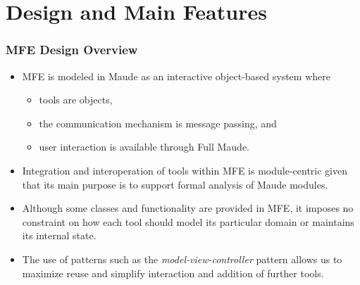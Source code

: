 \documentclass[xcolor=dvipsnames,10pt]{beamer}
\newcommand{\enfa}[1]{{\color{Red}#1}}
\begin{document}
\section{Design and Main Features}


\begin{frame}
  \frametitle{MFE Design Overview}

  \begin{itemize}
    \item MFE is modeled in Maude as an interactive \enfa{object-based system} where
      \begin{itemize}
        \item tools are objects, 
        \item the communication mechanism is message passing, and
        \item user interaction is available through Full Maude.
      \end{itemize}
    \item Integration and interoperation of tools within MFE is module-centric
      given that its main purpose is to support formal analysis of Maude modules.
    \item Although some classes and functionality are provided in MFE, it imposes
      no constraint on how each tool should model its particular domain or maintains
      its internal state.
    \item The use of patterns such as the {\em model-view-controller} 
pattern allows us to \enfa{maximize reuse and simplify interaction} and addition of further tools. 

  \end{itemize}
\end{frame}
\end{document}
